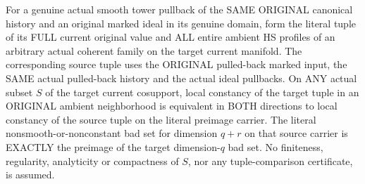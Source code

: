 \begin{theorem}
\label{hir:actual-original-canonical-smooth-full-tuple-neighborhood-variation}
\leanok
For a genuine actual smooth tower pullback of the SAME ORIGINAL canonical
history and an original marked ideal in its genuine domain, form the
literal tuple of its FULL current original value and ALL entire ambient
HS profiles of an arbitrary actual coherent family on the target current
manifold. The corresponding source tuple uses the ORIGINAL pulled-back
marked input, the SAME actual pulled-back history and the actual ideal
pullbacks. On ANY actual subset $S$ of the target current cosupport,
local constancy of the target tuple in an ORIGINAL ambient neighborhood
is equivalent in BOTH directions to local constancy of the source tuple
on the literal preimage carrier. The literal nonsmooth-or-nonconstant
bad set for dimension $q+r$ on that source carrier is EXACTLY the
preimage of the target dimension-$q$ bad set. No finiteness, regularity,
analyticity or compactness of $S$, nor any tuple-comparison certificate,
is assumed.
\end{theorem}

